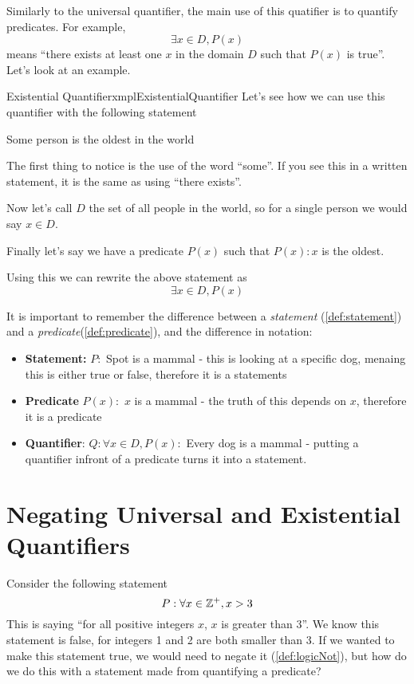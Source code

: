 Similarly to the universal quantifier, the main use of this quatifier is to quantify predicates. For example,
$$\exists x \in D, P(x)$$
means ``there exists at least one $x$ in the domain $D$ such that $P(x)$ is true''. Let's look at an example.

\begin{exmpl}[label={exmpl:existentialQuantifier}]{Existential Quantifier}{xmplExistentialQuantifier}
    Let's see how we can use this quantifier with the following statement

    \begin{center}
        Some person is the oldest in the world
    \end{center}

    The first thing to notice is the use of the word ``some''. If you see this in a written statement, it is the same as using ``there exists''.

    Now let's call $D$ the set of all people in the world, so for a single person we would say $x \in D$.

    Finally let's say we have a predicate $P(x)$ such that $P(x): x$ is the oldest.

    Using this we can rewrite the above statement as
    $$\exists x \in D, P(x)$$
\end{exmpl}

It is important to remember the difference between a \emph{statement} (\cref{def:statement}) and a \emph{predicate}(\cref{def:predicate}), and the difference in notation:
\begin{itemize}
    \item \textbf{Statement:} $P:$ Spot is a mammal - this is looking at a specific dog, menaing this is either true or false, therefore it is a statements
    \item \textbf{Predicate} $P(x):$ $x$ is a mammal - the truth of this depends on $x$, therefore it is a predicate
    \item \textbf{Quantifier}: $Q:\forall x \in D, P(x):$ Every dog is a mammal - putting a quantifier infront of a predicate turns it into a statement.
\end{itemize}

\section{Negating Universal and Existential Quantifiers}
Consider the following statement
$$P: \forall x \in \mathbb{Z}^+, x  > 3$$
This is saying ``for all positive integers $x$, $x$ is greater than 3''. We know this statement is false, for integers 1 and 2 are both smaller than 3. If we wanted to make this statement true, we would need to negate it (\cref{def:logicNot}), but how do we do this with a statement made from quantifying a predicate?

